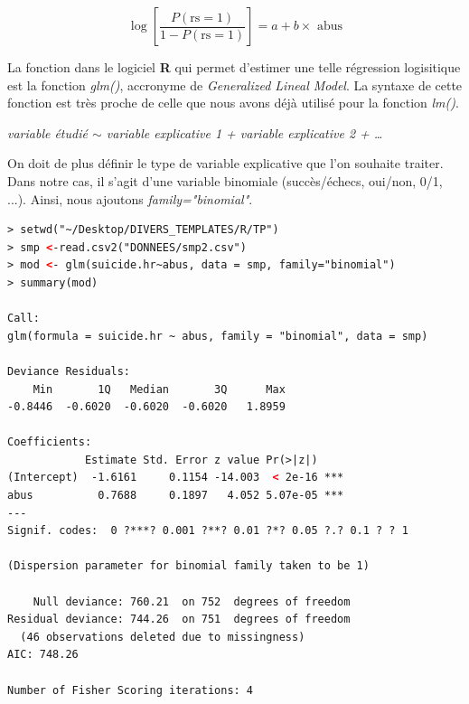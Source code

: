 $$\log\left[\frac{P(\textrm{rs} = 1)}{1-P(\textrm{rs} = 1)}\right] = a + b\times\textrm{ abus}$$

La fonction dans le logiciel \textbf{R} qui permet d'estimer une telle régression logisitique est la fonction \textit{glm()}, accronyme de \textit{Generalized Lineal Model}.\newline
La syntaxe de cette fonction est très proche de celle que nous avons déjà utilisé pour la fonction \textit{lm()}. 
\begin{center}
\textit{variable étudié $\sim$ variable explicative 1 + variable explicative 2 + \dots }
\end{center}
On doit de plus définir le type de variable explicative que l'on souhaite traiter. Dans notre cas, il s'agit d'une variable binomiale (succès/échecs, oui/non, 0/1, ...). Ainsi, nous ajoutons \textit{family="binomial"}.

\begin{lstlisting}[language=html]
> setwd("~/Desktop/DIVERS_TEMPLATES/R/TP")
> smp <-read.csv2("DONNEES/smp2.csv")
> mod <- glm(suicide.hr~abus, data = smp, family="binomial")
> summary(mod)

Call:
glm(formula = suicide.hr ~ abus, family = "binomial", data = smp)

Deviance Residuals: 
    Min       1Q   Median       3Q      Max  
-0.8446  -0.6020  -0.6020  -0.6020   1.8959  

Coefficients:
            Estimate Std. Error z value Pr(>|z|)    
(Intercept)  -1.6161     0.1154 -14.003  < 2e-16 ***
abus          0.7688     0.1897   4.052 5.07e-05 ***
---
Signif. codes:  0 ?***? 0.001 ?**? 0.01 ?*? 0.05 ?.? 0.1 ? ? 1

(Dispersion parameter for binomial family taken to be 1)

    Null deviance: 760.21  on 752  degrees of freedom
Residual deviance: 744.26  on 751  degrees of freedom
  (46 observations deleted due to missingness)
AIC: 748.26

Number of Fisher Scoring iterations: 4
\end{lstlisting}

